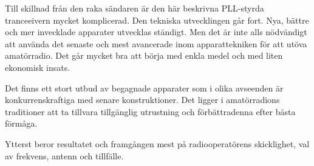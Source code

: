 Till skillnad från den raka sändaren är den här beskrivna PLL-styrda
tranceeivern mycket komplicerad. Den tekniska utvecklingen går
fort. Nya, bättre och mer invecklade apparater utvecklas ständigt. Men
det är inte alls nödvändigt att använda det senaste och mest
avancerade inom apparattekniken för att utöva amatörradio. Det går
mycket bra att börja med enkla medel och med liten ekonomisk insats.

Det finns ett stort utbud av begagnade apparater som i olika avseenden
är konkurrenskraftiga med senare konstruktioner. Det ligger i
amatörradions traditioner att ta tillvara tillgänglig utrustning och
förbättradenna efter bästa förmåga.

Ytterst beror resultatet och framgången mest på radiooperatörens
skicklighet, val av frekvens, antenn och tillfälle.
